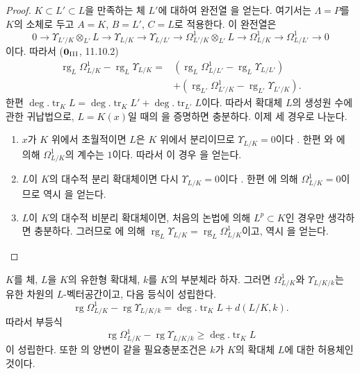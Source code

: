 \begin{proof}
$K\subset L'\subset L$을 만족하는 체 $L'$에 대하여 완전열
을 얻는다. 여기서는
$\Lambda=P$를 $K$의 소체로 두고 $A=K$, $B=L'$, $C=L$로 적용한다.
이 완전열은
\[
0\to\Upsilon_{L'/K}\otimes_{L'}L\to\Upsilon_{L/K}
\to\Upsilon_{L/L'}\to\Omega^1_{L'/K}\otimes_{L'}L
\to\Omega^1_{L/K}\to\Omega^1_{L/L'}\to0
\]
이다. 따라서 ($\mathbf 0_{\rm III}$, 11.10.2)
\[
\begin{split}
\operatorname{rg}_L\Omega^1_{L/K}-\operatorname{rg}_L\Upsilon_{L/K}
={}&(\operatorname{rg}_L\Omega^1_{L/L'}
-\operatorname{rg}_L\Upsilon_{L/L'})\\
&+(\operatorname{rg}_{L'}\Omega^1_{L'/K}
-\operatorname{rg}_{L'}\Upsilon_{L'/K}).
\end{split}
\]
한편
$\deg.\operatorname{tr}_K L=\deg.\operatorname{tr}_K L'
+\deg.\operatorname{tr}_{L'}L$이다. 따라서 확대체 $L$의 생성원 수에
관한 귀납법으로, $L=K(x)$일 때의 을 증명하면
충분하다. 이제 세 경우로 나눈다.
\begin{enumerate}
  \item[\rm a)] $x$가 $K$ 위에서 초월적이면 $L$은 $K$ 위에서
  분리이므로 $\Upsilon_{L/K}=0$이다 . 한편
  와 에 의해
  $\Omega^1_{L/K}$의 계수는 $1$이다. 따라서 이 경우
  을 얻는다.
  \item[\rm b)] $L$이 $K$의 대수적 분리 확대체이면 다시
  $\Upsilon_{L/K}=0$이다 . 한편
  에 의해 $\Omega^1_{L/K}=0$이므로 역시
  을 얻는다.
  \item[\rm c)] $L$이 $K$의 대수적 비분리 확대체이면, 처음의 논법에
  의해 $L^p\subset K$인 경우만 생각하면 충분하다. 그러므로
  에 의해
  $\operatorname{rg}_L\Upsilon_{L/K}
  =\operatorname{rg}_L\Omega^1_{L/K}$이고, 역시
  을 얻는다.
\end{enumerate}
\end{proof}

\begin{corollary}[21.7.2]
\label{0.21.7.2-ko}
$K$를 체, $L$을 $K$의 유한형 확대체, $k$를 $K$의 부분체라 하자.
그러면 $\Omega^1_{L/K}$와 $\Upsilon_{L/K/k}$는 유한 차원의
$L$-벡터공간이고, 다음 등식이 성립한다.
\begin{equation}
\tag{21.7.2.1}
\label{0.21.7.2.1-ko}
\operatorname{rg}\Omega^1_{L/K}-\operatorname{rg}\Upsilon_{L/K/k}
=\deg.\operatorname{tr}_K L+d(L/K,k).
\end{equation}
따라서 부등식
\begin{equation}
\tag{21.7.2.2}
\label{0.21.7.2.2-ko}
\operatorname{rg}\Omega^1_{L/K}-\operatorname{rg}\Upsilon_{L/K/k}
\geqslant\deg.\operatorname{tr}_K L
\end{equation}
이 성립한다. 또한 의 양변이 같을 필요충분조건은
$k$가 $K$의 확대체 $L$에 대한 허용체인 것이다.
\end{corollary}

